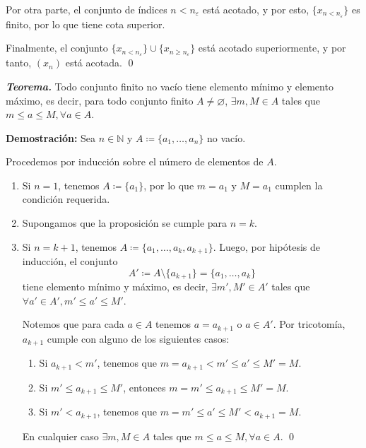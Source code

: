 \documentclass[11pt]{article}
\newcommand{\N}{\mathbb{N}}
\let\emptyset\varnothing
\begin{document}
\begin{enumerate}[label=\alph*)]
    Por otra parte, el conjunto de índices $n<n_\varepsilon$ está acotado, y por esto, $\{x_{n<n_\varepsilon}\}$ es finito, por lo que tiene cota superior. %
    
    Finalmente, el conjunto $\{x_{n<n_\varepsilon}\} \cup \{x_{n\geq n_\varepsilon}\}$ está acotado superiormente, y por tanto, $(x_n)$ está acotada. \qed
\end{enumerate}

\textbf{\textit{Teorema.}} Todo conjunto finito no vacío tiene elemento mínimo y elemento máximo, es decir, para todo conjunto finito $A\neq \emptyset$, $\exists m,M\in A$ tales que $m\leq a\leq M, \forall a\in A$.

\textbf{Demostración:} Sea $n\in \N$ y $A \coloneqq \{a_1, \dots, a_n\}$ no vacío.

Procedemos por inducción sobre el número de elementos de $A$. \begin{enumerate}[label=\roman*)]
    \item Si $n=1$, tenemos $A\coloneqq\{a_1\}$, por lo que $m=a_1$ y $M=a_1$ cumplen la condición requerida.
    \item Supongamos que la proposición se cumple para $n=k$.
    \item Si $n=k+1$, tenemos $A\coloneqq \{a_1, \dots, a_k, a_{k+1}\}$. Luego, por hipótesis de inducción, el conjunto \[A' \coloneqq A \setminus \{a_{k+1}\} = \{a_1, \dots, a_k\}\] tiene elemento mínimo y máximo, es decir, $\exists m',M'\in A'$ tales que $\forall a'\in A', m'\leq a' \leq M'$.
    
    Notemos que para cada $a\in A$ tenemos $a=a_{k+1}$ o $a\in A'$. Por tricotomía, $a_{k+1}$ cumple con alguno de los siguientes casos:
    \begin{enumerate}[label=\alph*)]
        \item Si $a_{k+1}<m'$, tenemos que $m=a_{k+1}<m'\leq a' \leq M'=M$.
        \item Si $m' \leq a_{k+1}\leq M'$, entonces $m=m'\leq a_{k+1} \leq M'=M$.
        \item Si $m'<a_{k+1}$, tenemos que $m=m'\leq a' \leq M'<a_{k+1}=M$.
    \end{enumerate}
    En cualquier caso $\exists m,M\in A$ tales que $m\leq a\leq M, \forall a\in A$. \qed
\end{enumerate}
\end{document}
